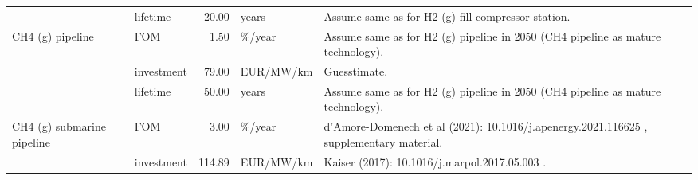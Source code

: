 \begin{longtable}{p{5cm}p{3cm}rp{3cm}p{11cm}}
                      & lifetime &          20.00 &                             years &                                                                                                                                                                                                                                                                                   Assume same as for H2 (g) fill compressor station. \\
CH4 (g) pipeline & FOM &           1.50 &                            \%/year &                                                                                                                                                                                                                                                      Assume same as for H2 (g) pipeline in 2050 (CH4 pipeline as mature technology). \\
                      & investment &          79.00 &                         EUR/MW/km &                                                                                                                                                                                                                                                                                                                         Guesstimate. \\
                      & lifetime &          50.00 &                             years &                                                                                                                                                                                                                                                      Assume same as for H2 (g) pipeline in 2050 (CH4 pipeline as mature technology). \\
CH4 (g) submarine pipeline & FOM &           3.00 &                            \%/year &                                                                                                                                                                                                                                              d’Amore-Domenech et al (2021): 10.1016/j.apenergy.2021.116625 , supplementary material. \\
                      & investment &         114.89 &                         EUR/MW/km &                                                                                                                                                                                                                                                                                        Kaiser (2017): 10.1016/j.marpol.2017.05.003 . \\

\end{longtable}
